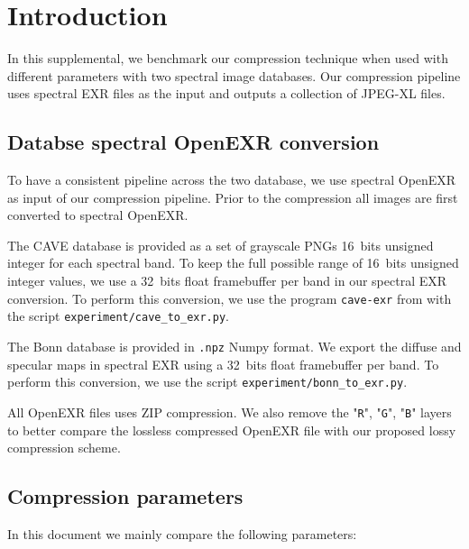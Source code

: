 \section{Introduction}

In this supplemental, we benchmark our compression technique when used with different parameters with two spectral image databases. Our compression pipeline uses spectral EXR files as the input and outputs a collection of JPEG-XL files.


\subsection{Databse spectral OpenEXR conversion}

To have a consistent pipeline across the two database, we use spectral OpenEXR as input of our compression pipeline. Prior to the compression all images are first converted to spectral OpenEXR.

The CAVE database is provided as a set of grayscale PNGs 16~bits unsigned integer for each spectral band. To keep the full possible range of 16~bits unsigned integer values, we use a 32~bits float framebuffer per band in our spectral EXR conversion. To perform this conversion, we use the program \verb?cave-exr? from with the script \verb?experiment/cave_to_exr.py?.

The Bonn database is provided in \verb?.npz? Numpy format. We export the diffuse and specular maps in spectral EXR using a 32~bits float framebuffer per band. To perform this conversion, we use the script \verb?experiment/bonn_to_exr.py?.

All OpenEXR files uses ZIP compression. We also remove the "\verb?R?", "\verb?G?", "\verb?B?" layers to better compare the lossless compressed OpenEXR file with our proposed lossy compression scheme.


\subsection{Compression parameters}

In this document we mainly compare the following parameters:

